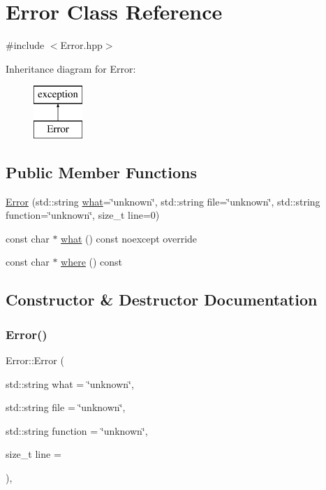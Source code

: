 \hypertarget{class_error}{}\section{Error Class Reference}
\label{class_error}


{\ttfamily \#include $<$Error.\+hpp$>$}

Inheritance diagram for Error\+:\begin{figure}[H]
\begin{center}
\leavevmode
\includegraphics[height=2.000000cm]{class_error}
\end{center}
\end{figure}
\subsection*{Public Member Functions}
\begin{DoxyCompactItemize}
\item 
\mbox{\hyperlink{class_error_ade8550ae7d8d29fa4264b21eeda312a4}{Error}} (std\+::string \mbox{\hyperlink{class_error_aba98fd2392ef0a6ac88623dfdca15102}{what}}=\char`\"{}unknown\char`\"{}, std\+::string file=\char`\"{}unknown\char`\"{}, std\+::string function=\char`\"{}unknown\char`\"{}, size\+\_\+t line=0)
\item 
const char $\ast$ \mbox{\hyperlink{class_error_aba98fd2392ef0a6ac88623dfdca15102}{what}} () const noexcept override
\item 
const char $\ast$ \mbox{\hyperlink{class_error_afa9c352dd85cee1ec0d372a3fb0153b9}{where}} () const
\end{DoxyCompactItemize}


\subsection{Constructor \& Destructor Documentation}
\mbox{\label{class_error_ade8550ae7d8d29fa4264b21eeda312a4}} 
\subsubsection{\texorpdfstring{Error()}{Error()}}
{\footnotesize\ttfamily Error\+::\+Error (\begin{DoxyParamCaption}\item[{std\+::string}]{what = {\ttfamily \char`\"{}unknown\char`\"{}},  }\item[{std\+::string}]{file = {\ttfamily \char`\"{}unknown\char`\"{}},  }\item[{std\+::string}]{function = {\ttfamily \char`\"{}unknown\char`\"{}},  }\item[{size\+\_\+t}]{line = {} }\end{DoxyParamCaption})\hspace{0.3cm}{\ttfamily [inline]}, {\ttfamily [explicit]}}



